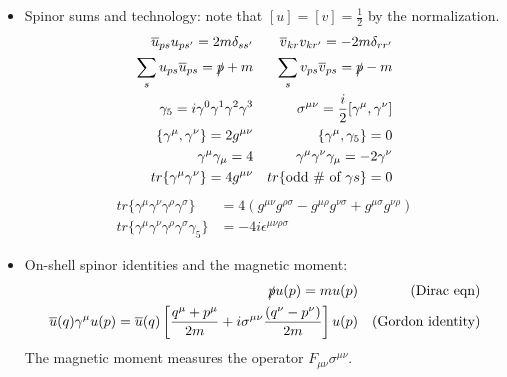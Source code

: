 \documentclass[11pt, oneside]{article}   	%
\theoremstyle{definition}
\numberwithin{equation}{subsection}		%
\begin{document}
\begin{itemize}
	\item Spinor sums and technology: note that $[u] = [v] = \frac{1}{2}$ by the normalization.
	\begin{align}
		\overline u_{ps} u_{ps'} = 2m\delta_{ss'} && \overline v_{kr} v_{kr'} = -2m\delta_{rr'} \\
		\sum_s u_{ps}\overline u_{ps} = \slashed p + m && \sum_s v_{ps}\overline v_{ps} = \slashed p - m \\
		\gamma_5 = i\gamma^0 \gamma^1 \gamma^2\gamma^3 && \sigma^{\mu\nu} = \frac{i}{2}[\gamma^\mu, \gamma^\nu] \\
		\{\gamma^\mu, \gamma^\nu\} = 2 g^{\mu\nu} && \{\gamma^\mu, \gamma_5\} = 0 \\
		\gamma^\mu \gamma_\mu = 4 && \gamma^\mu\gamma^\nu\gamma_\mu = -2\gamma^\nu  \\
		tr\{\gamma^\mu\gamma^\nu\} = 4 g^{\mu\nu} && tr\{\textnormal{odd \# of }\gamma s\} = 0
	\end{align}
	\begin{align}
		tr\{\gamma^\mu\gamma^\nu\gamma^\rho\gamma^\sigma\} &= 4(g^{\mu\nu} g^{\rho\sigma} - g^{\mu\rho} g^{\nu\sigma} + g^{\mu\sigma} g^{\nu\rho}) \\
		tr\{\gamma^\mu\gamma^\nu\gamma^\rho\gamma^\sigma\gamma_5\} &= -4i\epsilon^{\mu\nu\rho\sigma}
	\end{align}
	
	\item On-shell spinor identities and the magnetic moment:
	\begin{align}
		\slashed{p} u(p) = m u(p) && (\textnormal{Dirac eqn}) \\
		\overline u(q) \gamma^\mu u(p) = \overline u(q)\left[ \frac{q^\mu + p^\mu}{2m} + i\sigma^{\mu\nu} \frac{(q^\nu - p^\nu)}{2m} \right] u(p) && 
		(\textnormal{Gordon identity})
	\end{align}
	The magnetic moment measures the operator $F_{\mu\nu} \sigma^{\mu\nu}$. 
	

\end{itemize}
\end{document}
